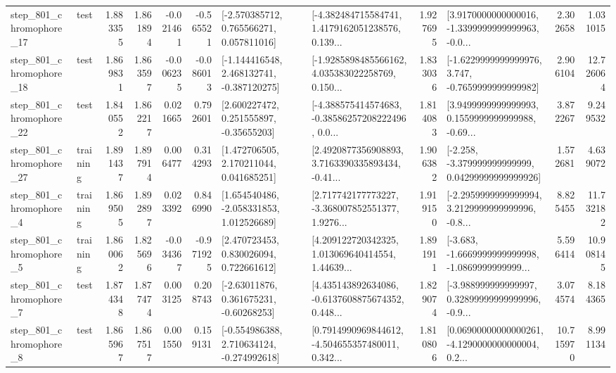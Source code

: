 \begin{tabular}{llrrrrllrlrr}
  step\_801\_chromophore\_17 &      test &      1.883355 &    1.861894 &     -0.021461 & -0.565521 &    [-2.570385712, 0.765566271, 0.057811016] &  [-4.382484715584741, 1.4179162051238576, 0.139... &       1.927695 &  [3.9170000000000016, -1.3399999999999963, -0.0... &            2.302658 &          1.031015 \\
  step\_801\_chromophore\_18 &      test &      1.869831 &    1.863597 &     -0.006235 & -0.086013 &   [-1.144416548, 2.468132741, -0.387120275] &  [-1.9285898485566162, 4.035383022258769, 0.150... &       1.833036 &  [-1.6229999999999976, 3.747, -0.7659999999999982] &            2.906104 &         12.726064 \\
  step\_801\_chromophore\_22 &      test &      1.840552 &    1.862217 &      0.021665 &  0.792601 &     [2.600227472, 0.251555897, -0.35655203] &  [-4.388575414574683, -0.38586257208222496, 0.0... &       1.814083 &  [3.9499999999999993, 0.1559999999999988, -0.69... &            3.872267 &          9.249532 \\
  step\_801\_chromophore\_27 &  training &      1.891437 &    1.897914 &      0.006477 &  0.314293 &     [1.472706505, 2.170211044, 0.041685251] &  [2.4920877356908893, 3.7163390335893434, -0.41... &       1.906382 &  [-2.258, -3.379999999999999, 0.04299999999999926] &            1.572681 &          4.639072 \\
   step\_801\_chromophore\_4 &  training &      1.869505 &    1.892897 &      0.023392 &  0.846990 &    [1.654540486, -2.058331853, 1.012526689] &  [2.717742177773227, -3.368007852551377, 1.9276... &       1.919150 &  [-2.2959999999999994, 3.2129999999999996, -0.8... &            8.825455 &         11.732182 \\
   step\_801\_chromophore\_5 &  training &      1.860062 &    1.825696 &     -0.034367 & -0.971925 &     [2.470723453, 0.830026094, 0.722661612] &  [4.209122720342325, 1.013069640414554, 1.44639... &       1.891911 &  [-3.683, -1.6669999999999998, -1.0869999999999... &            5.596414 &         10.908145 \\
   step\_801\_chromophore\_7 &      test &      1.874348 &    1.877474 &      0.003125 &  0.208743 &     [-2.63011876, 0.361675231, -0.60268253] &  [4.435143892634086, -0.6137608875674352, 0.448... &       1.829074 &  [-3.988999999999997, 0.32899999999999996, -0.9... &            3.074574 &          8.184365 \\
   step\_801\_chromophore\_8 &      test &      1.865967 &    1.867517 &      0.001550 &  0.159131 &   [-0.554986388, 2.710634124, -0.274992618] &  [0.7914990969844612, -4.504655357480011, 0.342... &       1.810806 &  [0.06900000000000261, -4.1290000000000004, 0.2... &           10.715970 &          8.991134 \\

\end{tabular}
